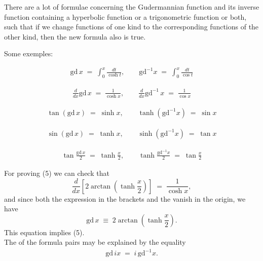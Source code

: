 \documentclass[12pt]{article}
\theoremstyle{definition}
\begin{document}

There are a lot of formulae concerning the Gudermannian function and its inverse function containing a hyperbolic function or a trigonometric function or both, such that if we change functions of one kind to the corresponding functions of the other kind, then the new formula also is true.

Some exemples:

\begin{align}
\mbox{gd}\,x \;=\; \int_0^x\!\frac{dt}{\cosh{t}}, \qquad \mbox{gd}^{-1}x \;=\; \int_0^x\!\frac{dt}{\cos{t}}
\end{align}

\begin{align}
\frac{d}{dx}\mbox{gd}\,x \;=\; \frac{1}{\cosh{x}}, \qquad \frac{d}{dx}\mbox{gd}^{-1}\,x \;=\; \frac{1}{\cos{x}}
\end{align}

\begin{align}
\tan(\mbox{gd}\,x) \;=\; \sinh{x}, \qquad \tanh(\mbox{gd}^{-1}x) \;=\; \sin{x}
\end{align}

\begin{align}
\sin(\mbox{gd}\,x) \;=\; \tanh{x}, \qquad \sinh(\mbox{gd}^{-1}x) \;=\; \tan{x}
\end{align}

\begin{align}
\tan\frac{\mbox{gd}\,x}{2} \;=\; \tanh\frac{x}{2}, \qquad \tanh\frac{\mbox{gd}^{-1}x}{2} \;=\; \tan\frac{x}{2}
\end{align}



For proving (5) we can check that
$$\frac{d}{dx}[2\arctan(\tanh\frac{x}{2})] \;=\; \frac{1}{\cosh{x}},$$
and since both the expression in the brackets and the  vanish in the origin, we have
$$\mbox{gd}\,x \;\equiv\; 2\arctan(\tanh\frac{x}{2}).$$
This equation implies (5).\\


The  of the formula pairs may be explained by the equality
\begin{align}
\mbox{gd}\,ix \;=\; i\,\mbox{gd}^{-1}x.
\end{align}
\end{document}
